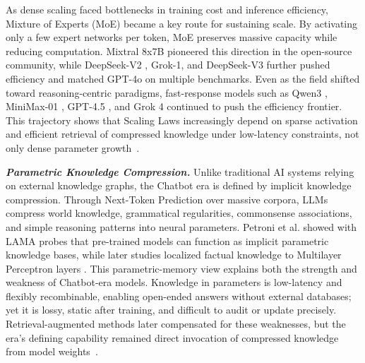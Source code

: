 As dense scaling faced bottlenecks in training cost and inference efficiency, Mixture of Experts (MoE) became a key route for sustaining scale. By activating only a few expert networks per token, MoE preserves massive capacity while reducing computation. Mixtral 8x7B \cite{jiang2024mixtral} pioneered this direction in the open-source community, while DeepSeek-V2 \cite{deepseek2024v2}, Grok-1, and DeepSeek-V3 \cite{deepseek2024v3} further pushed efficiency and matched GPT-4o \cite{hurst2024gpt} on multiple benchmarks. Even as the field shifted toward reasoning-centric paradigms, fast-response models such as Qwen3 \cite{qwen2025qwen3}, MiniMax-01 \cite{minimax2025minimax01scalingfoundationmodels}, GPT-4.5 \cite{openai2025gpt45}, and Grok 4 \cite{xai2025grok4} continued to push the efficiency frontier. This trajectory shows that Scaling Laws increasingly depend on sparse activation and efficient retrieval of compressed knowledge under low-latency constraints, not only dense parameter growth~\citep{srivastava2025technical,chen2025dast,wachi2026relative,li2026admtree,chen2026does,hong2025cooper,jiang2026verifiable}.

\textbf{\textit{Parametric Knowledge Compression.}} Unlike traditional AI systems relying on external knowledge graphs, the Chatbot era is defined by implicit knowledge compression. Through Next-Token Prediction over massive corpora, LLMs compress world knowledge, grammatical regularities, commonsense associations, and simple reasoning patterns into neural parameters. Petroni et al. \cite{petroni2019language} showed with LAMA probes that pre-trained models can function as implicit parametric knowledge bases, while later studies localized factual knowledge to Multilayer Perceptron layers \cite{meng2022locating,dai2022knowledge}. This parametric-memory view explains both the strength and weakness of Chatbot-era models. Knowledge in parameters is low-latency and flexibly recombinable, enabling open-ended answers without external databases; yet it is lossy, static after training, and difficult to audit or update precisely. Retrieval-augmented methods \cite{lewis2020retrieval} later compensated for these weaknesses, but the era's defining capability remained direct invocation of compressed knowledge from model weights~\citep{gunjal2025rubrics,zhang2025surveytts,chen2026fasttts,snell2025scaling,agarwal2025art}.


